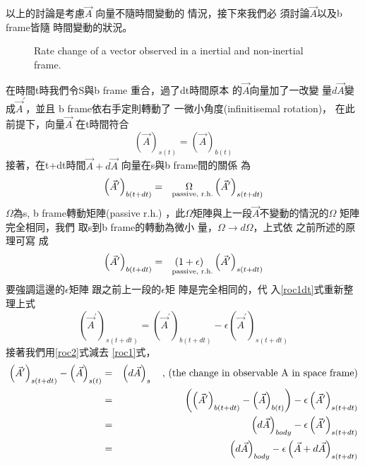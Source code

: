 \documentclass[12pt,twoside]{article}
\begin{document}
以上的討論是考慮$\vec{A}$%
向量不隨時間變動的%
情況，接下來我們必%
須討論$\vec{A}$以及b frame皆隨%
時間變動的狀況。

\begin{figure}[th]
\caption{Rate change of a vector observed in a inertial and non-inertial
frame.}
\label{ratevecfig}
\begin{center}
\fbox{}
\end{center}
\end{figure}

在時間t時我們令S與b frame%
重合，過了dt時間原本%
的$\vec{A}$向量加了一改變%
量$d\vec{A}$變成$\vec{A}^{\prime }$，並且%
b frame依右手定則轉動了%
一微小角度(infinitisemal rotation)，%
在此前提下，向量$\vec{A}$%
在t時間符合%
\begin{equation}
\left( \vec{A}\right) _{s(t)}=\left( \vec{A}\right) _{b(t)}  \label{roc1}
\end{equation}%
接著，在t+dt時間$\vec{A}+d\vec{A}$%
向量在s與b frame間的關係%
為%
\begin{equation}
\left( \vec{A}^{\prime }\right) _{b(t+dt)}=\underset{\text{passive, r.h.}}{%
\Omega }\left( \vec{A}^{\prime }\right) _{s(t+dt)}  \label{roc1dt}
\end{equation}%
$\Omega $為s, b frame轉動矩陣(passive r.h.)%
，此$\Omega $矩陣與上一段$%
\vec{A}$不變動的情況的$\Omega $%
矩陣完全相同，我們%
取s到b frame的轉動為微小%
量，$\Omega \rightarrow d\Omega $，上式依%
之前所述的原理可寫%
成%
\begin{equation*}
\left( \vec{A}^{\prime }\right) _{b(t+dt)}=\underset{\text{passive, r.h.}}{%
\left( 1+\epsilon \right) }\left( \vec{A}^{\prime }\right) _{s(t+dt)}
\end{equation*}%
要強調這邊的$\epsilon $矩陣%
跟之前上一段的$\epsilon $矩%
陣是完全相同的，代%
入\ref{roc1dt}式重新整理上式%
\begin{equation}
\left( \vec{A}^{\prime }\right) _{s(t+dt)}=\left( \vec{A}^{\prime }\right)
_{b(t+dt)}-\epsilon \left( \vec{A}^{\prime }\right) _{s(t+dt)}  \label{roc2}
\end{equation}%
接著我們用\ref{roc2}式減去%
\ref{roc1}式，%
\begin{eqnarray}
\left( \vec{A}^{\prime }\right) _{s(t+dt)}-\left( \vec{A}\right) _{s(t)}
&=&\left( d\vec{A}\right) _{s}\text{ , (the change in observable A in space
frame)}  \notag \\
&=&\left( \left( \vec{A}^{\prime }\right) _{b(t+dt)}-\left( \vec{A}\right)
_{b(t)}\right) -\epsilon \left( \vec{A}^{\prime }\right) _{s(t+dt)}  \notag
\\
&=&\left( d\vec{A}\right) _{body}-\epsilon \left( \vec{A}^{\prime }\right)
_{s(t+dt)}  \notag \\
&=&\left( d\vec{A}\right) _{body}-\epsilon \left( \vec{A}+d\vec{A}\right)
_{s(t+dt)}  \label{roc4}
\end{eqnarray}%
\end{document}
